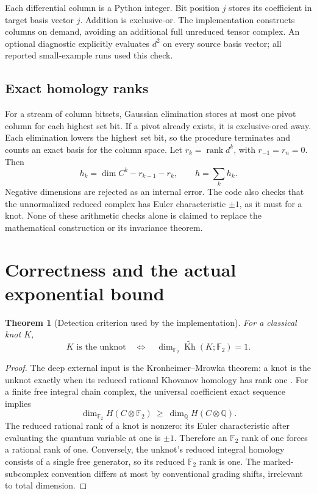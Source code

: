 \documentclass[11pt]{article}
\newtheorem{theorem}{Theorem}[section]
\theoremstyle{definition}
\newcommand{\F}{\mathbb F_2}
\newcommand{\Q}{\mathbb Q}
\newcommand{\Kh}{\widetilde{\operatorname{Kh}}}
\begin{document}
Each differential column is a Python integer. Bit position $j$ stores its
coefficient in target basis vector $j$. Addition is exclusive-or. The
implementation constructs columns on demand, avoiding an additional full
unreduced tensor complex. An optional diagnostic explicitly evaluates $d^2$ on
every source basis vector; all reported small-example runs used this check.

\subsection{Exact homology ranks}

For a stream of column bitsets, Gaussian elimination stores at most one pivot
column for each highest set bit. If a pivot already exists, it is exclusive-ored
away. Each elimination lowers the highest set bit, so the procedure terminates
and counts an exact basis for the column space. Let $r_k=\operatorname{rank}d^k$,
with $r_{-1}=r_n=0$. Then
\[
 h_k=\dim C^k-r_{k-1}-r_k,
 \qquad h=\sum_k h_k.
\]
Negative dimensions are rejected as an internal error. The code also checks
that the unnormalized reduced complex has Euler characteristic $\pm1$, as it
must for a knot. None of these arithmetic checks alone is claimed to replace
the mathematical construction or its invariance theorem.

\section{Correctness and the actual exponential bound}

\begin{theorem}[Detection criterion used by the implementation]
For a classical knot $K$,
\[
 K\text{ is the unknot}\quad\Longleftrightarrow\quad
 \dim_{\F}\Kh(K;\F)=1.
\]
\end{theorem}
\begin{proof}
The deep external input is the Kronheimer--Mrowka theorem: a knot is the unknot
exactly when its reduced rational Khovanov homology has rank one
\cite{detector}. For a finite free integral chain complex, the universal
coefficient exact sequence implies
\[
 \dim_{\F}H(C\otimes\F)\ \ge\ \dim_{\Q}H(C\otimes\Q).
\]
The reduced rational rank of a knot is nonzero: its Euler characteristic after
evaluating the quantum variable at one is $\pm1$. Therefore an $\F$ rank of one
forces a rational rank of one. Conversely, the unknot's reduced integral
homology consists of a single free generator, so its reduced $\F$ rank is one.
The marked-subcomplex convention differs at most by conventional grading
shifts, irrelevant to total dimension.
\end{proof}
\end{document}
